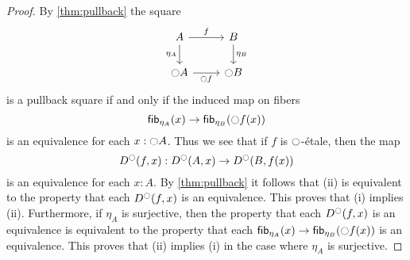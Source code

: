 \documentclass[9pt,twosided]{amsart}
\begin{document}
\begin{proof}
  By \cref{thm:pullback} the square
  \begin{equation*}
    \begin{tikzcd}
      A \arrow[r,"f"] \arrow[d,swap,"\eta_A"] & B \arrow[d,"\eta_B"] \\
      \modal A \arrow[r,swap,"\modal f"] & \modal B
    \end{tikzcd}
  \end{equation*}
  is a pullback square if and only if the induced map on fibers
  \begin{equation*}
    \fib{\eta_A}{x}\to \fib{\eta_B}{\modal f(x)}
  \end{equation*}
  is an equivalence for each $x:{\ocircle} A$. Thus we see that if $f$ is ${\ocircle}$-\'etale, then the map
  \begin{equation*}
    D^{\ocircle}(f,x) : D^{\ocircle}(A,x)\to D^{\ocircle}(B,f(x))
  \end{equation*}
  is an equivalence for each $x:A$. By \cref{thm:pullback} it follows that (ii) is equivalent to the property that each $D^{\ocircle}(f,x)$ is an equivalence. This proves that (i) implies (ii). Furthermore, if $\eta_A$ is surjective, then the property that each $D^{\ocircle}(f,x)$ is an equivalence is equivalent to the property that each $\fib{\eta_A}{x}\to \fib{\eta_B}{\modal f(x)}$ is an equivalence. This proves that (ii) implies (i) in the case where $\eta_A$ is surjective.
\end{proof}

\begin{comment}%
\begin{cor}
If $f:A\to B$ is $\modal$-\'etale, then the square
\begin{equation*}
\begin{tikzcd}[column sep=large]
A \arrow[d,swap,"\delta_{\modalunit}"] \arrow[r,"f"] & B \arrow[d,"\delta_{\modalunit}"] \\
A\times_{\modal A} A \arrow[r,swap,"f\times_{\modal f}f"] & B\times_{\modal B} B
\end{tikzcd}
\end{equation*}
is a pullback square.
\end{cor}

\begin{proof}
Consider the diagram
\begin{equation*}
\begin{tikzcd}[column sep=large]
A \arrow[d,swap,"\delta_{\modalunit}"] \arrow[r,"f"] & B \arrow[d,"\delta_{\modalunit}"] \\
A\times_{\modal A} A \arrow[d,swap,"\proj 1"] \arrow[r,"{f\times_{\modal f} f}"] & B\times_{\modal B} B \arrow[d,"\proj 1"] \\
A \arrow[r,"f"] & B
\end{tikzcd}
\end{equation*}
The bottom square is a pullback square by \cref{lem:etale_char}, and the outer rectangle is a pullback since both vertical composites are homotopic to the respective identity functions. Therefore the top square is a pullback.
\end{proof}
\end{comment}
\end{document}
